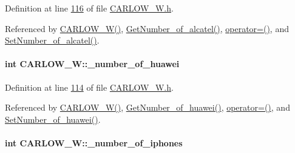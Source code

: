 Definition at line \hyperlink{_c_a_r_l_o_w___w_8h_source_l00116}{116} of file \hyperlink{_c_a_r_l_o_w___w_8h_source}{C\+A\+R\+L\+O\+W\+\_\+\+W.\+h}.



Referenced by \hyperlink{_c_a_r_l_o_w___w_8h_source_l00024}{C\+A\+R\+L\+O\+W\+\_\+\+W()}, \hyperlink{_c_a_r_l_o_w___w_8cpp_source_l00075}{Get\+Number\+\_\+of\+\_\+alcatel()}, \hyperlink{_c_a_r_l_o_w___w_8h_source_l00075}{operator=()}, and \hyperlink{_c_a_r_l_o_w___w_8cpp_source_l00071}{Set\+Number\+\_\+of\+\_\+alcatel()}.

\paragraph[{\texorpdfstring{\+\_\+number\+\_\+of\+\_\+huawei}{_number_of_huawei}}]{\setlength{\rightskip}{0pt plus 5cm}int C\+A\+R\+L\+O\+W\+\_\+\+W\+::\+\_\+number\+\_\+of\+\_\+huawei\hspace{0.3cm}{\ttfamily [private]}}\hypertarget{class_c_a_r_l_o_w___w_acc2837ed943bb51134e5878e818970fd_acc2837ed943bb51134e5878e818970fd}{}\label{class_c_a_r_l_o_w___w_acc2837ed943bb51134e5878e818970fd_acc2837ed943bb51134e5878e818970fd}


Definition at line \hyperlink{_c_a_r_l_o_w___w_8h_source_l00114}{114} of file \hyperlink{_c_a_r_l_o_w___w_8h_source}{C\+A\+R\+L\+O\+W\+\_\+\+W.\+h}.



Referenced by \hyperlink{_c_a_r_l_o_w___w_8h_source_l00024}{C\+A\+R\+L\+O\+W\+\_\+\+W()}, \hyperlink{_c_a_r_l_o_w___w_8cpp_source_l00091}{Get\+Number\+\_\+of\+\_\+huawei()}, \hyperlink{_c_a_r_l_o_w___w_8h_source_l00075}{operator=()}, and \hyperlink{_c_a_r_l_o_w___w_8cpp_source_l00087}{Set\+Number\+\_\+of\+\_\+huawei()}.

\paragraph[{\texorpdfstring{\+\_\+number\+\_\+of\+\_\+iphones}{_number_of_iphones}}]{\setlength{\rightskip}{0pt plus 5cm}int C\+A\+R\+L\+O\+W\+\_\+\+W\+::\+\_\+number\+\_\+of\+\_\+iphones\hspace{0.3cm}{\ttfamily [private]}}\hypertarget{class_c_a_r_l_o_w___w_aff9e9a986b6390d6fa51f52d43a8c0e8_aff9e9a986b6390d6fa51f52d43a8c0e8}{}\label{class_c_a_r_l_o_w___w_aff9e9a986b6390d6fa51f52d43a8c0e8_aff9e9a986b6390d6fa51f52d43a8c0e8}


